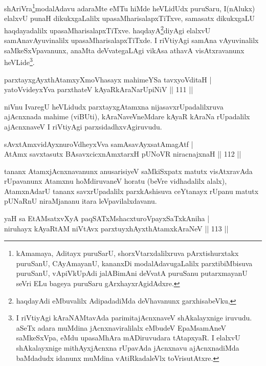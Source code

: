\begin{artha}
shAriVra\footnote[4]{kAmamaya, Aditayx puruSarU, shorxVtarxdalilxruva pArxtishurxtakx puruSanU, CAyAmayanU, kananxDi modalAdavugaLalilx parxtibiMbisuva puruSanU, vApiVkUpAdi jalABimAni deVvatA puruSanu putarxmayanU seVri ELu bageya puruSaru gArxhayxrAgidAdxre.}modalAdavu adaraMte eMTu hiMde heVLidUdx puruSaru, I(nAlukx) elalxvU punaH dikukxgaLalilx upasaMharisalapxTiTxve, samasatx dikukxgaLU haqdayadalilx upasaMharisalapxTiTxve. haqdayA\footnote[5]{haqdayAdi eMbuvalilx AdipadadiMda deVhavanunx garxhisabeVku,}diyAgi elalxvU samAnavAyuvinalilx upasaMharisalapxTiTxde. I riVtiyAgi samAna vAyuvinalilx saMkeSxVpavanunx, anaMta deVvategaLAgi vikAsa athavA visAtxravanunx heVLide\footnote[6]{I riVtiyAgi kAraNAMtavAda parimitajAcnxnaveV shAkalayxnige iruvudu. aSeTx adara muMdina jAcnxnaviralilalx eMbudeV EpaMsamAneV saMkeSxVpa, eMdu upasaMhAra mADiruvudara tAtapxyaR. I elalxvU shAkalayxnige mithAyxjAcnxna rUpavAda jAcnxnavu ajAcnxnadiMda baMdadudx idanunx muMdina vAtiRkadaleVlx toVrisutAtxre.}.
\end{artha}

\begin{shl}
parxtayxgAyxthAtamxyXmoVhasayx mahimeYSa tavxyoVditaH |\\
yatoV\s videyxYva parxthateV kAyaRkAraNarUpiNiV \hfill || 111 ||
\end{shl}

\begin{artha}%
niVnu IvaregU heVLidudx parxtayxgAtamxna nijasavxrUpadalilxruva ajAcnxnada mahime (viBUti), kAraNaveVneMdare kAyaR kAraNa rUpadalilx ajAcnxnaveV I riVtiyAgi parxsidadhxvAgiruvudu.
\end{artha}


\begin{shl}
sAvxtAmxvidAyxnuroVdheyxVva samAsavAyxsatAmagAtf |\\
AtAmx savxtasutx BAsavxcicxnAmxtarxH pUNoVR niracnajxnaH \hfill || 112 ||
\end{shl}

\begin{artha}
tananx AtamxjAcnxnavanunx anusarisiyeV saMkiSxpatx matutx visAtxravAda rUpavanunx Atamxnu hoMdiruvaneV horatu (beVre vidhadalilx alalx), AtamxnAdarU tananx savxrUpadalilx parxkAshisuva ceYtanayx rUpanu matutx pUNaRnU niraMjananu itara leVpavilalxdavanu.
\end{artha}

\begin{shl}
yaH sa EtAMsatxvXyA paqSATxMshacxturoV\s payxSaTxkAniha |\\
niruhayx kAyaRtAM niVtAvx parxtuyxhAyxthA\s \s tamxkAraNeV \hfill || 113 ||
\end{shl}

